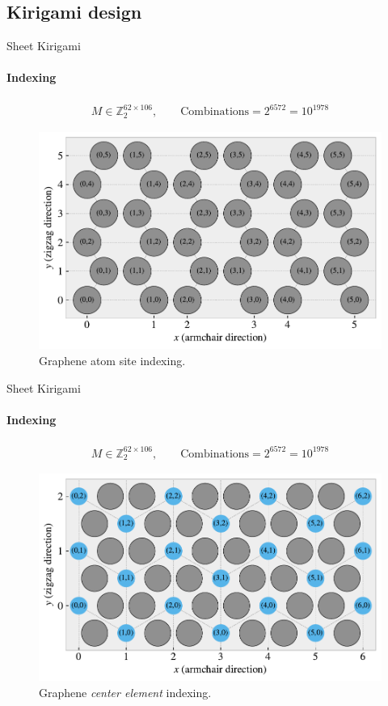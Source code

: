 \documentclass[
	10pt, %
]{beamer}
\begin{document}
\subsection{Kirigami design}
\begin{frame}{Sheet Kirigami}
	\framesubtitle{Indexing}
	\begin{align*}
		M \in \mathbb{Z}_2^{62 \times 106}, \qquad \text{Combinations} = 2^{6572} = 10^{1978}
	\end{align*}
	\begin{figure}[H]
		\centering
		\includegraphics[width=0.7\linewidth]{../thesis/figures/system/atom_indexing.pdf}
		\caption{Graphene atom site indexing.}
	\end{figure}	
\end{frame}
%
%
\begin{frame}{Sheet Kirigami}
	\framesubtitle{Indexing}
	\begin{align*}
		M \in \mathbb{Z}_2^{62 \times 106}, \qquad \text{Combinations} = 2^{6572} = 10^{1978}
	\end{align*}
	\begin{figure}[H]
		\centering
		\includegraphics[width=0.7\linewidth]{../thesis/figures/system/center_indexing.pdf}
		\caption{Graphene \textit{center element} indexing.}
	\end{figure}	
\end{frame}
\end{document}
